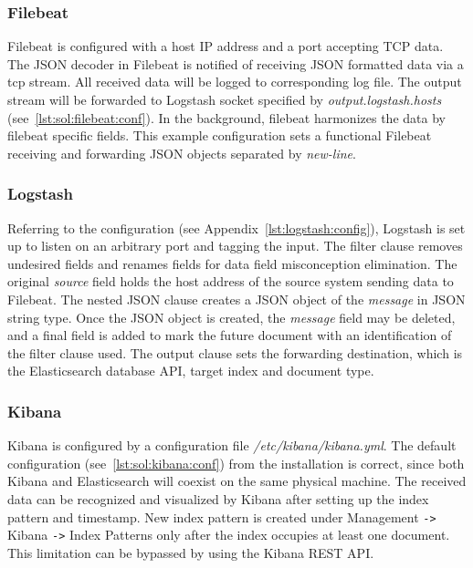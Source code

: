 \documentclass[12pt,a4paper,twoside]{book}
\begin{document}
            \subsubsection*{Filebeat}
                Filebeat is configured with a host IP address and a port accepting TCP data. The JSON decoder in Filebeat is notified of receiving JSON formatted data via a tcp stream. All received data will be logged to corresponding log file. The output stream will be forwarded to Logstash socket specified by \emph{output.logstash.hosts} (see~\autoref{lst:sol:filebeat:conf}). In the background, filebeat harmonizes the data by filebeat specific fields. This example configuration sets a functional Filebeat receiving and forwarding JSON objects separated by \emph{new-line}.
                
            \subsubsection*{Logstash}
                Referring to the configuration (see Appendix~\autoref{lst:logstash:config}), Logstash is set up to listen on an arbitrary port and tagging the input. The filter clause removes undesired fields and renames fields for data field misconception elimination. The original \emph{source} field holds the host address of the source system sending data to Filebeat. The nested JSON clause creates a JSON object of the \emph{message} in JSON string type. Once the JSON object is created, the \emph{message} field may be deleted, and a final field is added to mark the future document with an identification of the filter clause used. The output clause sets the forwarding destination, which is the Elasticsearch database API, target index and document type.
            \subsubsection*{Kibana}
                Kibana is configured by a configuration file \emph{/etc/kibana/kibana.yml}. The default configuration (see~\autoref{lst:sol:kibana:conf}) from the installation is correct, since both Kibana and Elasticsearch will coexist on the same physical machine. The received data can be recognized and visualized by Kibana after setting up the index pattern and timestamp. New index pattern is created under Management \texttt{->} Kibana \texttt{->} Index Patterns only after the index occupies at least one document. This limitation can be bypassed by using the Kibana REST API.
                
\end{document}

